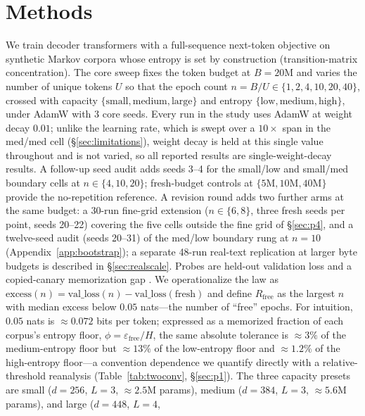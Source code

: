 \documentclass[11pt]{article}
\begin{document}
\section{Methods}\label{sec:setup}

We train decoder transformers with a full-sequence next-token objective on synthetic
Markov corpora \citep{bietti2023birth} whose entropy is set by construction
(transition-matrix concentration). The
core sweep fixes the token budget at $B = 20$M and varies the number of unique tokens $U$
so that the epoch count $n = B/U \in \{1, 2, 4, 10, 20, 40\}$, crossed with capacity
$\{\text{small}, \text{medium}, \text{large}\}$ and entropy $\{\text{low}, \text{medium},
\text{high}\}$, under AdamW with 3 core seeds. Every run in the study uses AdamW at
weight decay $0.01$; unlike the learning rate, which is swept over a $10\times$ span
in the med/med cell (\S\ref{sec:limitations}), weight decay is held at this single
value throughout and is not varied, so all reported results are single-weight-decay
results. A follow-up seed audit adds seeds 3--4 for
the small/low and small/med boundary cells at $n\in\{4,10,20\}$; fresh-budget controls at
$\{5\text{M}, 10\text{M}, 40\text{M}\}$ provide the no-repetition reference. A revision
round adds two further arms at the same budget: a 30-run fine-grid extension
($n\in\{6,8\}$, three fresh seeds per point, seeds 20--22) covering the five cells
outside the fine grid of \S\ref{sec:p4}, and a twelve-seed audit (seeds 20--31) of the
med/low boundary rung at $n{=}10$ (Appendix~\ref{app:bootstrap}); a separate 48-run
real-text replication at larger byte budgets is described in \S\ref{sec:realscale}. Probes are held-out
validation loss and a copied-canary memorization gap \citep{carlini2019secret}. We operationalize the law as
$\mathrm{excess}(n) = \mathrm{val\_loss}(n) - \mathrm{val\_loss}(\text{fresh})$ and define
$R_{\mathrm{free}}$ as the largest $n$ with median excess below $0.05$ nats---the number
of ``free'' epochs. For intuition, $0.05$ nats is ${\approx}0.072$ bits per token;
expressed as a memorized fraction of each corpus's entropy floor,
$\phi = \varepsilon_{\mathrm{free}}/H$, the same absolute tolerance is ${\approx}3\%$ of
the medium-entropy floor but ${\approx}13\%$ of the low-entropy floor and
${\approx}1.2\%$ of the high-entropy floor---a convention dependence we quantify
directly with a relative-threshold reanalysis (Table~\ref{tab:twoconv},
\S\ref{sec:p1}). The three capacity presets are small ($d{=}256$, $L{=}3$, ${\approx}2.5$M
params), medium ($d{=}384$, $L{=}3$, ${\approx}5.6$M params), and large ($d{=}448$, $L{=}4$,
\end{document}
